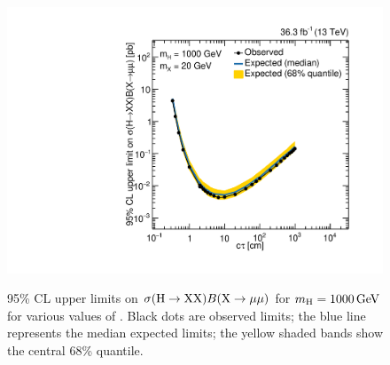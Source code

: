 \begin{figure}[htbp]
  \hspace*{-2em}
  \includegraphics[width=\DSquareWidth]{figures/displaced/Limits_2Mu_1000_20_HybridNew.pdf} \\
  \caption[95\% CL upper limits on $\sigma(\PHiggs\to \PLLP\PLLP)B(\PLLP\to\Pgm\Pgm)$ for $\mH = 1000\GeV$ for various values of \mX.]{95\% CL upper limits on $\sigma(\PHiggs\to \PLLP\PLLP)B(\PLLP\to\Pgm\Pgm)$ for $\mH = 1000\GeV$ for various values of \mX. Black dots are observed limits; the blue line represents the median expected limits; the yellow shaded bands show the central 68\% quantile.}
  \label{fig:dd:UpperLimits_mH_1000}
\end{figure}

